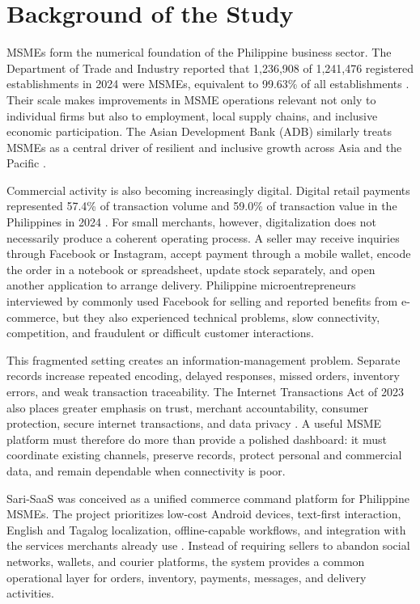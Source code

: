 \documentclass[12pt,oneside]{report}
\begin{document}
\section{Background of the Study}
MSMEs form the numerical foundation of the Philippine business sector. The
Department of Trade and Industry reported that 1,236,908 of 1,241,476 registered
establishments in 2024 were MSMEs, equivalent to 99.63\% of all establishments
\parencite{dti2024msme}. Their scale makes improvements in MSME operations
relevant not only to individual firms but also to employment, local supply
chains, and inclusive economic participation. The Asian Development Bank (ADB)
similarly treats MSMEs as a central driver of resilient and inclusive growth
across Asia and the Pacific \parencite{adb2024monitor}.

Commercial activity is also becoming increasingly digital. Digital retail
payments represented 57.4\% of transaction volume and 59.0\% of transaction
value in the Philippines in 2024 \parencite{bsp2024payments}. For small
merchants, however, digitalization does not necessarily produce a coherent
operating process. A seller may receive inquiries through Facebook or
Instagram, accept payment through a mobile wallet, encode the order in a
notebook or spreadsheet, update stock separately, and open another application
to arrange delivery. Philippine microentrepreneurs interviewed by
\textcite{romero2023women} commonly used Facebook for selling and reported
benefits from e-commerce, but they also experienced technical problems, slow
connectivity, competition, and fraudulent or difficult customer interactions.

This fragmented setting creates an information-management problem. Separate
records increase repeated encoding, delayed responses, missed orders, inventory
errors, and weak transaction traceability. The Internet Transactions Act of
2023 also places greater emphasis on trust, merchant accountability, consumer
protection, secure internet transactions, and data privacy
\parencite{philippines2023ita}. A useful MSME platform must therefore do more
than provide a polished dashboard: it must coordinate existing channels,
preserve records, protect personal and commercial data, and remain dependable
when connectivity is poor.

Sari-SaaS was conceived as a unified commerce command platform for Philippine
MSMEs. The project prioritizes low-cost Android devices, text-first interaction,
English and Tagalog localization, offline-capable workflows, and integration
with the services merchants already use \parencite{sariSpec2026}. Instead of
requiring sellers to abandon social networks, wallets, and courier platforms,
the system provides a common operational layer for orders, inventory, payments,
messages, and delivery activities.
\end{document}
